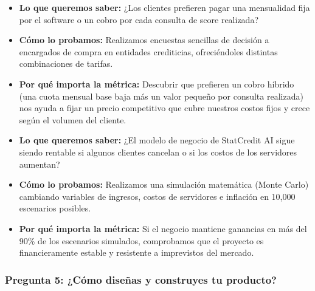 \documentclass[11pt,a4paper]{article}
\begin{document}
\begin{tcolorbox}[colback=lightgray,colframe=secondary,title=\textbf{Experimento 4.1: Encuesta de preferencia de modelo de cobro}]
\begin{itemize}[leftmargin=*]
    \item \textbf{Lo que queremos saber:} ¿Los clientes prefieren pagar una mensualidad fija por el software o un cobro por cada consulta de score realizada?
    \item \textbf{Cómo lo probamos:} Realizamos encuestas sencillas de decisión a encargados de compra en entidades crediticias, ofreciéndoles distintas combinaciones de tarifas.
    \item \textbf{Por qué importa la métrica:} Descubrir que prefieren un cobro híbrido (una cuota mensual base baja más un valor pequeño por consulta realizada) nos ayuda a fijar un precio competitivo que cubre nuestros costos fijos y crece según el volumen del cliente.
\end{itemize}
\end{tcolorbox}

\begin{tcolorbox}[colback=lightgray,colframe=secondary,title=\textbf{Experimento 4.2: Simulación de estabilidad financiera (Monte Carlo)}]
\begin{itemize}[leftmargin=*]
    \item \textbf{Lo que queremos saber:} ¿El modelo de negocio de StatCredit AI sigue siendo rentable si algunos clientes cancelan o si los costos de los servidores aumentan?
    \item \textbf{Cómo lo probamos:} Realizamos una simulación matemática (Monte Carlo) cambiando variables de ingresos, costos de servidores e inflación en 10,000 escenarios posibles.
    \item \textbf{Por qué importa la métrica:} Si el negocio mantiene ganancias en más del 90\% de los escenarios simulados, comprobamos que el proyecto es financieramente estable y resistente a imprevistos del mercado.
\end{itemize}
\end{tcolorbox}

\subsubsection{Pregunta 5: ¿Cómo diseñas y construyes tu producto?}
\end{document}

